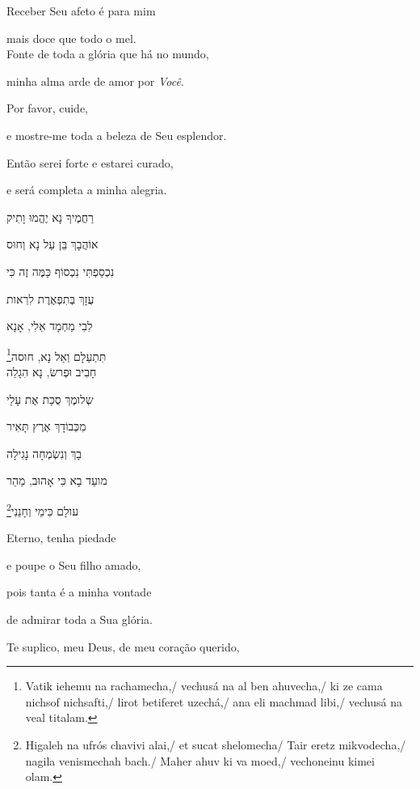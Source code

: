 Receber Seu afeto é para mim

mais doce que todo o mel.\\[10pt]

{Fonte de toda a glória que há no mundo},

minha alma arde de amor por \emph{Você}.

Por favor, cuide,

e mostre-me toda a beleza de Seu esplendor.

Então serei forte e estarei curado,

e será completa a minha alegria.\\[10pt]

\movetoevenpage
\raggedleft

\vspace*{1cm}

רַחֲמֶיךָ נָא יֶהֱמוּ וָתִיק \label{ref02}

אוֹהֲבָךְ בֵּן עַל נָא וְחוּס 

נִכְסַפְתִּי נִכְסוֹף כַּמֶּה זֶה כִּי 

עֻזָךְ בְּתִפְאֶרֶת לִרְאות 

לִבִי מַחְמָד אֵלִי, אָנָא 

\footnote{Vatik iehemu na rachamecha,/
vechusá na al ben ahuvecha,/ ki ze cama nichsof nichsafti,/ lirot betiferet uzechá,/
ana eli machmad libi,/ vechusá na veal titalam.}תִּתְעַלָם וְאַל נָא, חוּסה\\[10pt]

חָבִיב וּפְרשׂ, נָא הִגָלֵה

שְלומֶךְ סֻכַת אֶת עָלַי 

מִכְּבוֹדָךְ אֶרֶץ תָּאִיר 

בָךְ וְנִשְׂמְחָה נָגִילָה 

מועֵד בָא כִּי אָהוּב, מַהֵר

\footnote{
Higaleh na ufrós chavivi alai,/
et sucat shelomecha/ Tair eretz mikvodecha,/ nagila venismechah bach./ Maher ahuv ki va moed,/
vechoneinu kimei olam.}עולָם כִּימֵי וְחָנֵנִי

\movetooddpage
\raggedright

\vspace*{1cm}

Eterno, tenha piedade

e poupe o Seu filho amado,

pois tanta é a minha vontade

de admirar toda a Sua glória.

Te suplico, meu Deus, de meu coração querido,

